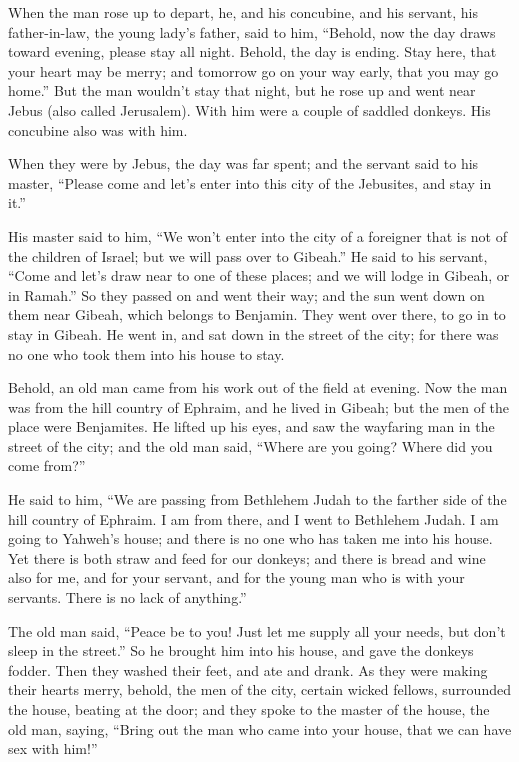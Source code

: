  When the man rose up to depart, he, and his concubine, and
his servant, his father-in-law, the young lady's father, said to him,
``Behold, now the day draws toward evening, please stay all night.
Behold, the day is ending. Stay here, that your heart may be merry; and
tomorrow go on your way early, that you may go home.''  But
the man wouldn't stay that night, but he rose up and went near Jebus
(also called Jerusalem). With him were a couple of saddled donkeys. His
concubine also was with him.

 When they were by Jebus, the day was far spent; and the
servant said to his master, ``Please come and let's enter into this city
of the Jebusites, and stay in it.''

 His master said to him, ``We won't enter into the city of
a foreigner that is not of the children of Israel; but we will pass over
to Gibeah.''  He said to his servant, ``Come and let's draw
near to one of these places; and we will lodge in Gibeah, or in Ramah.''
 So they passed on and went their way; and the sun went
down on them near Gibeah, which belongs to Benjamin.  They
went over there, to go in to stay in Gibeah. He went in, and sat down in
the street of the city; for there was no one who took them into his
house to stay.

 Behold, an old man came from his work out of the field at
evening. Now the man was from the hill country of Ephraim, and he lived
in Gibeah; but the men of the place were Benjamites.  He
lifted up his eyes, and saw the wayfaring man in the street of the city;
and the old man said, ``Where are you going? Where did you come from?''

 He said to him, ``We are passing from Bethlehem Judah to
the farther side of the hill country of Ephraim. I am from there, and I
went to Bethlehem Judah. I am going to Yahweh's house; and there is no
one who has taken me into his house.  Yet there is both
straw and feed for our donkeys; and there is bread and wine also for me,
and for your servant, and for the young man who is with your servants.
There is no lack of anything.''

 The old man said, ``Peace be to you! Just let me supply
all your needs, but don't sleep in the street.''  So he
brought him into his house, and gave the donkeys fodder. Then they
washed their feet, and ate and drank.  As they were making
their hearts merry, behold, the men of the city, certain wicked fellows,
surrounded the house, beating at the door; and they spoke to the master
of the house, the old man, saying, ``Bring out the man who came into
your house, that we can have sex with him!''

